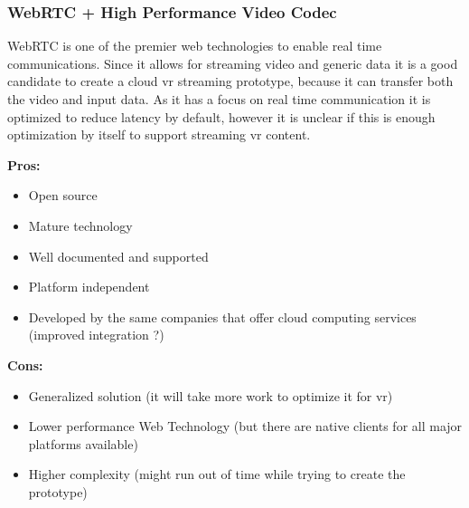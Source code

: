 \subsubsection{WebRTC + High Performance Video Codec}
WebRTC is one of the premier web technologies to enable real time communications. Since it allows for streaming video and generic data it is a good candidate to create a cloud \acrshort{vr} streaming prototype, because it can transfer both the video and input data. As it has a focus on real time communication it is optimized to reduce latency by default, however it is unclear if this is enough optimization by itself to support streaming \acrshort{vr} content. \\
\newline
\begin{varwidth}[t]{.5\textwidth}
\renewcommand\labelitemi{+}
\textbf{Pros:}
\begin{itemize}
\item Open source
\item Mature technology
\item Well documented and supported
\item Platform independent
\item Developed by the same companies that offer cloud computing services (improved integration ?)
\end{itemize}
\end{varwidth}
\hspace{4em}
\begin{varwidth}[t]{.5\textwidth}
\renewcommand\labelitemi{-}
\textbf{Cons:}
\begin{itemize}
\item Generalized solution (it will  take more work to optimize it for \acrshort{vr})
\item Lower performance Web Technology (but there are native clients for all major platforms available)
\item Higher complexity (might run out of time while trying to create the prototype)
\end{itemize}
\end{varwidth}